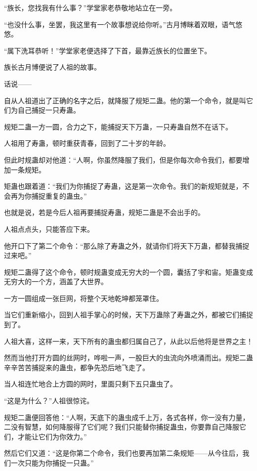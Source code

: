 
\begin{this_body}

“族长，您找我有什么事？”学堂家老恭敬地站立在一旁。

“也没什么事，坐罢，我这里有一个故事想说给你听。”古月博眯着双眼，语气悠悠。

“属下洗耳恭听！”学堂家老便选择了下首，最靠近族长的位置坐下。

族长古月博便说了人祖的故事。

话说——

自从人祖道出了正确的名字之后，就降服了规矩二蛊。他的第一个命令，就是叫它们为自己捕捉一只寿蛊。

规矩二蛊一方一圆，合力之下，能捕捉天下万蛊，一只寿蛊自然不在话下。

人祖用了寿蛊，顿时重获青春，回到了二十岁的年龄。

但此时规蛊却对他道：“人啊，你虽然降服了我们，但是你每次命令我们，都要增加一条规矩。

矩蛊也跟着道：“我们为你捕捉了寿蛊，这是第一次命令。我们的新规矩就是，不会再为你捕捉重复的蛊虫。”

也就是说，若是今后人祖再要捕捉寿蛊，规矩二蛊是不会出手的。

人祖点点头，只能答应下来。

他开口下了第二个命令：“那么除了寿蛊之外，就请你们将天下万蛊，都替我捕捉过来吧。”

规矩二蛊得了这个命令，顿时规蛊变成无穷大的一个圆，囊括了宇和宙。矩蛊变成无穷大的一个方，涵盖了大世界。

一方一圆组成一张巨网，将整个天地乾坤都笼罩住。

当它们重新缩小，回到人祖手掌心的时候，天下万蛊除了寿蛊之外，都被它们捕捉到了。

人祖大喜，这样一来，天下所有的蛊虫都归属自己了，从此以后他将是世界之主！

然而当他打开方圆的丝网时，哗啦一声，一股巨大的虫流向外喷涌而出。规矩二蛊辛辛苦苦捕捉来的蛊虫，都争先恐后地飞走了。

当人祖连忙地合上方圆的网时，里面只剩下五只蛊虫了。

“这是为什么？”人祖很惊诧。

规矩二蛊便回答他：“人啊，天底下的蛊虫成千上万，各式各样，你一没有力量，二没有智慧，如何降服得了它们呢？我们只能替你捕捉蛊虫，你要靠自己降服它们，才能让它们为你效力。”

然后它们又道：“这是你第二个命令，我们也要再加第二条规矩——从今往后，我们一次只能为你捕捉一只蛊。”


\end{this_body}
